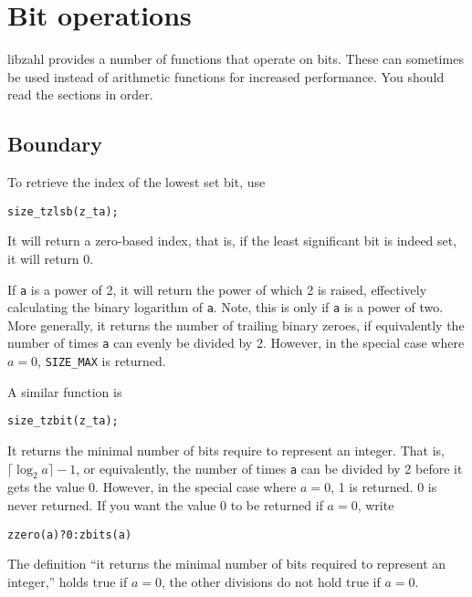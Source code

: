 \chapter{Bit operations}
\label{chap:Bit operations}

libzahl provides a number of functions that operate on
bits. These can sometimes be used instead of arithmetic
functions for increased performance. You should read
the sections in order.

\vspace{1cm}
\minitoc


\newpage
\section{Boundary}
\label{sec:Boundary}

To retrieve the index of the lowest set bit, use

\begin{alltt}
   size_t zlsb(z_t a);
\end{alltt}

\noindent
It will return a zero-based index, that is, if the
least significant bit is indeed set, it will return 0.

If {\tt a} is a power of 2, it will return the power
of which 2 is raised, effectively calculating the
binary logarithm of {\tt a}. Note, this is only if
{\tt a} is a power of two. More generally, it returns
the number of trailing binary zeroes, if equivalently
the number of times {\tt a} can evenly be divided by
2. However, in the special case where $a = 0$,
{\tt SIZE\_MAX} is returned.

A similar function is

\begin{alltt}
   size_t zbit(z_t a);
\end{alltt}

\noindent
It returns the minimal number of bits require to
represent an integer. That is, $\lceil \log_2 a \rceil - 1$,
or equivalently, the number of times {\tt a} can be
divided by 2 before it gets the value 0. However, in
the special case where $a = 0$, 1 is returned. 0 is
never returned. If you want the value 0 to be returned
if $a = 0$, write

\begin{alltt}
   zzero(a) ? 0 : zbits(a)
\end{alltt}

The definition ``it returns the minimal number
of bits required to represent an integer,''
holds true if $a = 0$, the other divisions
do not hold true if $a = 0$.


